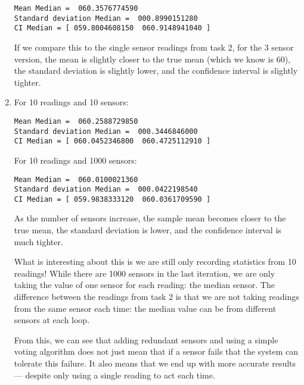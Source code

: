 \documentclass{article}
\begin{document}
\begin{enumerate}
\begin{lstlisting}
Mean Median =  060.3576774590 
Standard deviation Median =  000.8990151280 
CI Median = [ 059.8004608150  060.9148941040 ]
\end{lstlisting}

If we compare this to the single sensor readings from task 2, for the 3 sensor version, the mean is slightly closer to the true mean (which we know is 60), the standard deviation is slightly lower, and the confidence interval is slightly tighter.

 \item For 10 readings and 10 sensors:

\begin{lstlisting}
Mean Median =  060.2588729850 
Standard deviation Median =  000.3446846000 
CI Median = [ 060.0452346800  060.4725112910 ]
\end{lstlisting}

For 10 readings and 1000 sensors:

\begin{lstlisting}
Mean Median =  060.0100021360 
Standard deviation Median =  000.0422198540 
CI Median = [ 059.9838333120  060.0361709590 ]
\end{lstlisting}

As the number of sensors increase, the sample mean becomes closer to the true mean, the standard deviation is lower, and the confidence interval is much tighter.

What is interesting about this is we are still only recording statistics from 10 readings! While there are 1000 sensors in the last iteration, we are only taking the value of one sensor for each reading: the median sensor. The difference between the readings from task 2 is that we are not taking readings from the same sensor each time: the median value can be from different sensors at each loop.

From this, we can see that adding redundant sensors and using a simple voting algorithm does not just mean that if a sensor fails that the system can tolerate this failure. It also means that we end up with more accurate results --- despite only using a single reading to act each time.

\end{enumerate}
\end{document}
